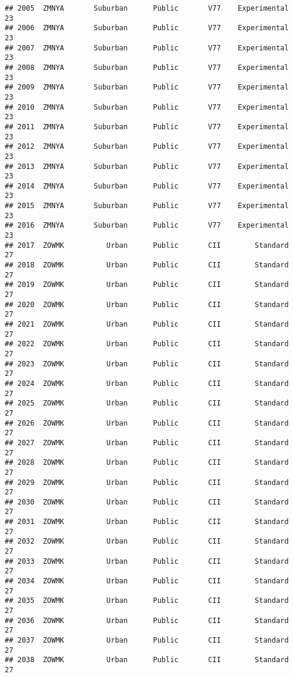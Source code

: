 \documentclass[
]{article}
\begin{document}
\begin{verbatim}
## 2005  ZMNYA       Suburban      Public       V77    Experimental        23
## 2006  ZMNYA       Suburban      Public       V77    Experimental        23
## 2007  ZMNYA       Suburban      Public       V77    Experimental        23
## 2008  ZMNYA       Suburban      Public       V77    Experimental        23
## 2009  ZMNYA       Suburban      Public       V77    Experimental        23
## 2010  ZMNYA       Suburban      Public       V77    Experimental        23
## 2011  ZMNYA       Suburban      Public       V77    Experimental        23
## 2012  ZMNYA       Suburban      Public       V77    Experimental        23
## 2013  ZMNYA       Suburban      Public       V77    Experimental        23
## 2014  ZMNYA       Suburban      Public       V77    Experimental        23
## 2015  ZMNYA       Suburban      Public       V77    Experimental        23
## 2016  ZMNYA       Suburban      Public       V77    Experimental        23
## 2017  ZOWMK          Urban      Public       CII        Standard        27
## 2018  ZOWMK          Urban      Public       CII        Standard        27
## 2019  ZOWMK          Urban      Public       CII        Standard        27
## 2020  ZOWMK          Urban      Public       CII        Standard        27
## 2021  ZOWMK          Urban      Public       CII        Standard        27
## 2022  ZOWMK          Urban      Public       CII        Standard        27
## 2023  ZOWMK          Urban      Public       CII        Standard        27
## 2024  ZOWMK          Urban      Public       CII        Standard        27
## 2025  ZOWMK          Urban      Public       CII        Standard        27
## 2026  ZOWMK          Urban      Public       CII        Standard        27
## 2027  ZOWMK          Urban      Public       CII        Standard        27
## 2028  ZOWMK          Urban      Public       CII        Standard        27
## 2029  ZOWMK          Urban      Public       CII        Standard        27
## 2030  ZOWMK          Urban      Public       CII        Standard        27
## 2031  ZOWMK          Urban      Public       CII        Standard        27
## 2032  ZOWMK          Urban      Public       CII        Standard        27
## 2033  ZOWMK          Urban      Public       CII        Standard        27
## 2034  ZOWMK          Urban      Public       CII        Standard        27
## 2035  ZOWMK          Urban      Public       CII        Standard        27
## 2036  ZOWMK          Urban      Public       CII        Standard        27
## 2037  ZOWMK          Urban      Public       CII        Standard        27
## 2038  ZOWMK          Urban      Public       CII        Standard        27

\end{verbatim}
\end{document}
